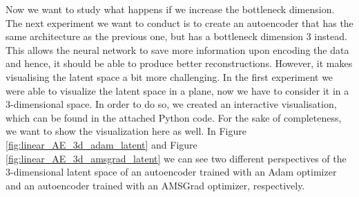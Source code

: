Now we want to study what happens if we increase the bottleneck dimension. The next experiment we want to conduct is to create an autoencoder that has the same architecture as the previous one, but has a bottleneck dimension $3$ instead. This allows the neural network to save more information upon encoding the data and hence, it should be able to produce better reconstructions. However, it makes visualising the latent space a bit more challenging. In the first experiment we were able to visualize the latent space in a plane, now we have to consider it in a $3$-dimensional space. In order to do so, we created an interactive visualisation, which can be found in the attached Python code. For the sake of completeness, we want to show the visualization here as well. In Figure \ref{fig:linear_AE_3d_adam_latent} and Figure \ref{fig:linear_AE_3d_amsgrad_latent} we can see two different perspectives of the $3$-dimensional latent space of an autoencoder trained with an Adam optimizer and an autoencoder trained with an AMSGrad optimizer, respectively.

